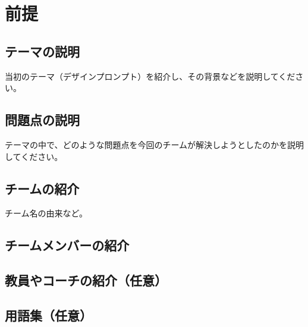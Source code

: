 \section{前提}
\subsection{テーマの説明}
当初のテーマ（デザインプロンプト）を紹介し、その背景などを説明してください。

\subsection{問題点の説明}
テーマの中で、どのような問題点を今回のチームが解決しようとしたのかを説明してください。

\subsection{チームの紹介}
チーム名の由来など。

\subsection{チームメンバーの紹介}

\subsection{教員やコーチの紹介（任意）}

\subsection{用語集（任意）}

